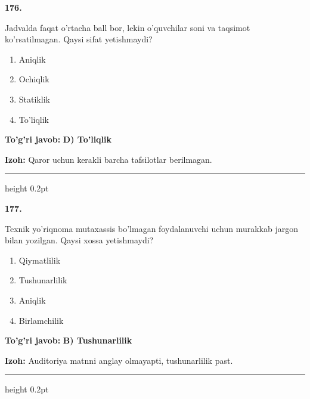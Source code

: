 \documentclass[10pt,a4paper,oneside]{article}
\begin{document}
\noindent\textbf{\color{ink}176.}
\par
Jadvalda faqat o'rtacha ball bor, lekin o'quvchilar soni va taqsimot ko'rsatilmagan. Qaysi sifat yetishmaydi?
\begin{enumerate}[label=\Alph*),leftmargin=9mm]
\item Aniqlik
\item Ochiqlik
\item Statiklik
\item To'liqlik
\end{enumerate}
\begin{tcolorbox}[enhanced,breakable,colback=teal!4,colframe=teal!50!black,boxrule=0.5pt,arc=1.1mm,left=3mm,right=3mm,top=1.7mm,bottom=1.7mm,before skip=2mm,after skip=2mm]
\textbf{\color{teal}To'g'ri javob:} \textbf{D) To'liqlik}
\par\smallskip
\textbf{Izoh:} Qaror uchun kerakli barcha tafsilotlar berilmagan.
\end{tcolorbox}
\vspace{2mm}\hrule height 0.2pt \vspace{3mm}

\noindent\textbf{\color{ink}177.}
\par
Texnik yo'riqnoma mutaxassis bo'lmagan foydalanuvchi uchun murakkab jargon bilan yozilgan. Qaysi xossa yetishmaydi?
\begin{enumerate}[label=\Alph*),leftmargin=9mm]
\item Qiymatlilik
\item Tushunarlilik
\item Aniqlik
\item Birlamchilik
\end{enumerate}
\begin{tcolorbox}[enhanced,breakable,colback=teal!4,colframe=teal!50!black,boxrule=0.5pt,arc=1.1mm,left=3mm,right=3mm,top=1.7mm,bottom=1.7mm,before skip=2mm,after skip=2mm]
\textbf{\color{teal}To'g'ri javob:} \textbf{B) Tushunarlilik}
\par\smallskip
\textbf{Izoh:} Auditoriya matnni anglay olmayapti, tushunarlilik past.
\end{tcolorbox}
\vspace{2mm}\hrule height 0.2pt \vspace{3mm}
\end{document}
